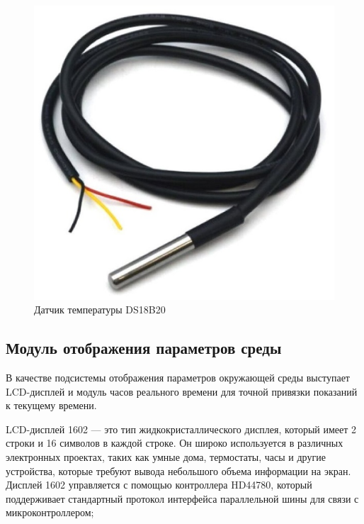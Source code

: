 \begin{enumerate}
    \begin{figure}[H]
        \centering
        \includegraphics[scale=0.8]{images/temperature.jpg}
        \caption{Датчик температуры DS18B20}
        \label{fig:temp}
    \end{figure}
    
\end{enumerate}

\subsection{Модуль отображения параметров среды}

В качестве подсистемы отображения параметров окружающей среды выступает LCD-дисплей и модуль часов реального времени для точной привязки показаний к текущему времени.

LCD-дисплей 1602 --- это тип жидкокристаллического дисплея, который имеет 2 строки и 16 символов в каждой строке. Он широко используется в различных электронных проектах, таких как умные дома, термостаты, часы и другие устройства, которые требуют вывода небольшого объема информации на экран. Дисплей 1602 управляется с помощью контроллера HD44780, который поддерживает стандартный протокол интерфейса параллельной шины для связи с микроконтроллером;


